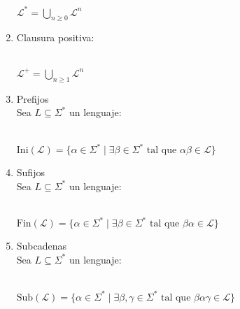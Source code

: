 \documentclass[12pt]{article}
\begin{document}
\begin{enumerate}
    \centerline{$\mathcal{L}^*=  \bigcup_{n \geq 0} \mathcal{L}^{n}$}
    \item {Clausura positiva:}
    \\
    \\
    \centerline{$\mathcal{L}^+=  \bigcup_{n \geq 1} \mathcal{L}^{n}$}
    \item {Prefijos}
    \\
    Sea $\mathcal{}{L} \subseteq \Sigma^{*}$ un lenguaje:
    \\
    \\
    \centerline{$\text{Ini}(\mathcal{L}) = \{ \alpha \in \Sigma^* \mid \exists \beta \in \Sigma^* \text{ tal que } \alpha\beta \in \mathcal{L} \}$}
    \item {Sufijos}
    \\
    Sea $\mathcal{}{L} \subseteq \Sigma^{*}$ un lenguaje:
    \\
    \\
    \centerline{$\text{Fin}(\mathcal{L}) = \{ \alpha \in \Sigma^* \mid \exists \beta \in \Sigma^* \text{ tal que } \beta\alpha \in \mathcal{L} \}$}
    \item {Subcadenas}
    \\
    Sea $\mathcal{}{L} \subseteq \Sigma^{*}$ un lenguaje:
    \\
    \\
    \centerline{$\text{Sub}(\mathcal{L}) = \{ \alpha \in \Sigma^* \mid \exists \beta, \gamma \in \Sigma^* \text{ tal que } \beta\alpha\gamma \in \mathcal{L} \}$}
\end{enumerate}
\end{document}
